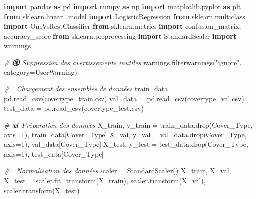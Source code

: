 \documentclass[
  letterpaper,
  DIV=11,
  numbers=noendperiod]{scrartcl}
\newenvironment{Shaded}{}{}
\newcommand{\CommentTok}[1]{\textcolor[rgb]{0.38,0.63,0.69}{\textit{#1}}}
\newcommand{\DecValTok}[1]{\textcolor[rgb]{0.25,0.63,0.44}{#1}}
\newcommand{\ImportTok}[1]{\textcolor[rgb]{0.00,0.50,0.00}{\textbf{#1}}}
\newcommand{\NormalTok}[1]{#1}
\newcommand{\OperatorTok}[1]{\textcolor[rgb]{0.40,0.40,0.40}{#1}}
\newcommand{\PreprocessorTok}[1]{\textcolor[rgb]{0.74,0.48,0.00}{#1}}
\newcommand{\StringTok}[1]{\textcolor[rgb]{0.25,0.44,0.63}{#1}}
\begin{document}
\begin{Shaded}
\begin{Highlighting}[]
\ImportTok{import}\NormalTok{ pandas }\ImportTok{as}\NormalTok{ pd}
\ImportTok{import}\NormalTok{ numpy }\ImportTok{as}\NormalTok{ np}
\ImportTok{import}\NormalTok{ matplotlib.pyplot }\ImportTok{as}\NormalTok{ plt}
\ImportTok{from}\NormalTok{ sklearn.linear\_model }\ImportTok{import}\NormalTok{ LogisticRegression}
\ImportTok{from}\NormalTok{ sklearn.multiclass }\ImportTok{import}\NormalTok{ OneVsRestClassifier}
\ImportTok{from}\NormalTok{ sklearn.metrics }\ImportTok{import}\NormalTok{ confusion\_matrix, accuracy\_score}
\ImportTok{from}\NormalTok{ sklearn.preprocessing }\ImportTok{import}\NormalTok{ StandardScaler}
\ImportTok{import}\NormalTok{ warnings}

\CommentTok{\# 🔇 Suppression des avertissements inutiles}
\NormalTok{warnings.filterwarnings(}\StringTok{"ignore"}\NormalTok{, category}\OperatorTok{=}\PreprocessorTok{UserWarning}\NormalTok{)}

\CommentTok{\# 🔄 Chargement des ensembles de données}
\NormalTok{train\_data }\OperatorTok{=}\NormalTok{ pd.read\_csv(}\StringTok{\textquotesingle{}covertype\_train.csv\textquotesingle{}}\NormalTok{)}
\NormalTok{val\_data }\OperatorTok{=}\NormalTok{ pd.read\_csv(}\StringTok{\textquotesingle{}covertype\_val.csv\textquotesingle{}}\NormalTok{)}
\NormalTok{test\_data }\OperatorTok{=}\NormalTok{ pd.read\_csv(}\StringTok{\textquotesingle{}covertype\_test.csv\textquotesingle{}}\NormalTok{)}

\CommentTok{\# 📊 Préparation des données}
\NormalTok{X\_train, y\_train }\OperatorTok{=}\NormalTok{ train\_data.drop(}\StringTok{\textquotesingle{}Cover\_Type\textquotesingle{}}\NormalTok{, axis}\OperatorTok{=}\DecValTok{1}\NormalTok{), train\_data[}\StringTok{\textquotesingle{}Cover\_Type\textquotesingle{}}\NormalTok{]}
\NormalTok{X\_val, y\_val }\OperatorTok{=}\NormalTok{ val\_data.drop(}\StringTok{\textquotesingle{}Cover\_Type\textquotesingle{}}\NormalTok{, axis}\OperatorTok{=}\DecValTok{1}\NormalTok{), val\_data[}\StringTok{\textquotesingle{}Cover\_Type\textquotesingle{}}\NormalTok{]}
\NormalTok{X\_test, y\_test }\OperatorTok{=}\NormalTok{ test\_data.drop(}\StringTok{\textquotesingle{}Cover\_Type\textquotesingle{}}\NormalTok{, axis}\OperatorTok{=}\DecValTok{1}\NormalTok{), test\_data[}\StringTok{\textquotesingle{}Cover\_Type\textquotesingle{}}\NormalTok{]}

\CommentTok{\# 🔢 Normalisation des données}
\NormalTok{scaler }\OperatorTok{=}\NormalTok{ StandardScaler()}
\NormalTok{X\_train, X\_val, X\_test }\OperatorTok{=}\NormalTok{ scaler.fit\_transform(X\_train), scaler.transform(X\_val), scaler.transform(X\_test)}


\end{Highlighting}
\end{Shaded}
\end{document}
